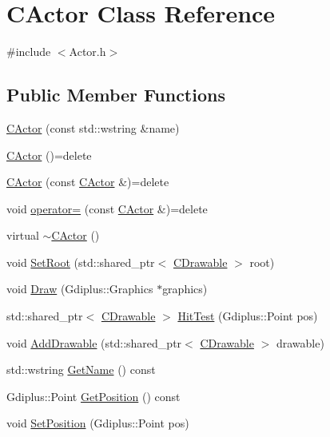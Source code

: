 \hypertarget{class_c_actor}{}\section{C\+Actor Class Reference}
\label{class_c_actor}


{\ttfamily \#include $<$Actor.\+h$>$}

\subsection*{Public Member Functions}
\begin{DoxyCompactItemize}
\item 
\hyperlink{class_c_actor_a2849f9370b66ddeaa727c8b7045d62c2}{C\+Actor} (const std\+::wstring \&name)
\item 
\hyperlink{class_c_actor_ae7683d5f0b3edc85dc47850fa71de40f}{C\+Actor} ()=delete
\item 
\hyperlink{class_c_actor_a8af986ad4ec530967f942aaebd853632}{C\+Actor} (const \hyperlink{class_c_actor}{C\+Actor} \&)=delete
\item 
void \hyperlink{class_c_actor_aa947810cfb2f45129b501296bcad837c}{operator=} (const \hyperlink{class_c_actor}{C\+Actor} \&)=delete
\item 
virtual \hyperlink{class_c_actor_adca86a138fd9af275352336848ebad27}{$\sim$\+C\+Actor} ()
\item 
void \hyperlink{class_c_actor_af0417205281ecd3bc52a367724cc6635}{Set\+Root} (std\+::shared\+\_\+ptr$<$ \hyperlink{class_c_drawable}{C\+Drawable} $>$ root)
\item 
void \hyperlink{class_c_actor_a78048c684b231e498184d963b57fffe2}{Draw} (Gdiplus\+::\+Graphics $\ast$graphics)
\item 
std\+::shared\+\_\+ptr$<$ \hyperlink{class_c_drawable}{C\+Drawable} $>$ \hyperlink{class_c_actor_a63676c04fa760cd9fc56d85cb0542cd1}{Hit\+Test} (Gdiplus\+::\+Point pos)
\item 
void \hyperlink{class_c_actor_a943e05a65bde59998079ab647ec0e7ec}{Add\+Drawable} (std\+::shared\+\_\+ptr$<$ \hyperlink{class_c_drawable}{C\+Drawable} $>$ drawable)
\item 
std\+::wstring \hyperlink{class_c_actor_aee85c15c97f5f9652cb4c083772798e6}{Get\+Name} () const 
\item 
Gdiplus\+::\+Point \hyperlink{class_c_actor_ae3c531320a80c83419b4239c3227192b}{Get\+Position} () const 
\item 
void \hyperlink{class_c_actor_af0bda8fd0ba0320f9fd6e67b7b16a07d}{Set\+Position} (Gdiplus\+::\+Point pos)

\end{DoxyCompactItemize}
